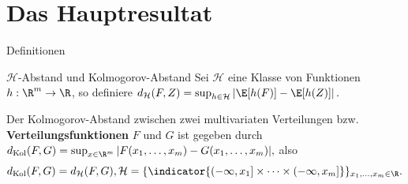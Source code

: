 \section{Das Hauptresultat}
\begin{frame}{Definitionen}
    \small
    \vspace{-0.4cm}
    \begin{definitionblockname}{$\mathcal{H}$-Abstand und Kolmogorov-Abstand}
        Sei $\mathcal{H}$ eine Klasse von Funktionen $h: \R^m \to \R$, so definiere
            $d_{\mathcal{H}}(F, Z) = \sup_{h \in \mathcal{H}} \left|\E[h(F)]- \E[h(Z)]\right|.$

        Der Kolmogorov-Abstand zwischen zwei multivariaten Verteilungen bzw. \textbf{Verteilungsfunktionen} $F$ und $G$ ist gegeben durch $
        d_{\text{Kol}}(F,G) = \sup_{x \in \R^m} |F(x_1, \ldots, x_m) - G(x_1, \ldots, x_m)|,$
        also 
        \[
            d_{\text{Kol}}(F,G) = d_{\mathcal{H}}(F,G), \mathcal{H} = \{\indicator{(-\infty, x_1]\times \cdots \times (-\infty, x_m]}\}_{x_1, \ldots, x_m \in \R}.
        \]
    \end{definitionblockname}
\end{frame}
